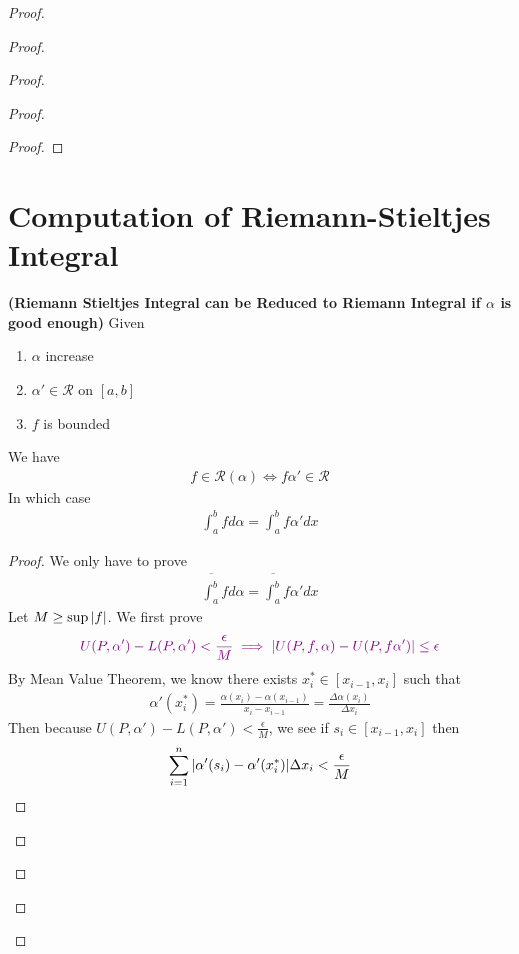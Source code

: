 \documentclass{report}
\begin{document}
\begin{proof}
\begin{proof}
\begin{proof}
\begin{proof}
\begin{proof}
\end{proof}


\section{Computation of Riemann-Stieltjes Integral}
\begin{theorem}
\textbf{(Riemann Stieltjes Integral can be Reduced to Riemann Integral if $\alpha $ is good enough)} Given 
\begin{enumerate}[label=(\alph*)]
  \item $\alpha $ increase 
  \item $\alpha '\in \mathscr{R}$ on $[a,b]$ 
  \item $f$ is bounded
\end{enumerate}
We have 
\begin{align*}
 f\in \mathscr{R}(\alpha )\iff  f\alpha ' \in \mathscr{R}
\end{align*}
In which case 
\begin{align*}
\int_a^b fd\alpha =\int_a^b f \alpha ' dx
\end{align*}
\end{theorem}
\begin{proof}
We only have to prove 
\begin{align*}
\overline{\int_a^b} fd\alpha = \overline{\int_a^b}f\alpha ' dx 
\end{align*}
Let $M\geq \sup |f|$. We first prove 
\begin{align*}
  \textcolor{violet}{U(P,\alpha ')-L(P,\alpha ')<\frac{\epsilon}{M}\implies |U(P,f,\alpha )-U(P,f\alpha ')|\leq \epsilon }
\end{align*}
By Mean Value Theorem, we know there exists $x_i^* \in [x_{i-1},x_i]$ such that 
\begin{align*}
\alpha' (x_i^*)= \frac{\alpha (x_i)-\alpha (x_{i-1})}{x_i-x_{i-1}}=\frac{\Delta \alpha (x_i)}{\Delta x_i}
\end{align*}
Then because $U(P,\alpha ')-L(P,\alpha ')<\frac{\epsilon}{M}$, we see if $s_i \in [x_{i-1},x_i]$ then 
\begin{align*}
\sum_{i=1}^n |\alpha '(s_i)-\alpha '(x_i^*)| \Delta x_i <\frac{\epsilon}{M}
\end{align*}

\end{proof}
\end{proof}
\end{proof}
\end{proof}
\end{proof}
\end{document}
